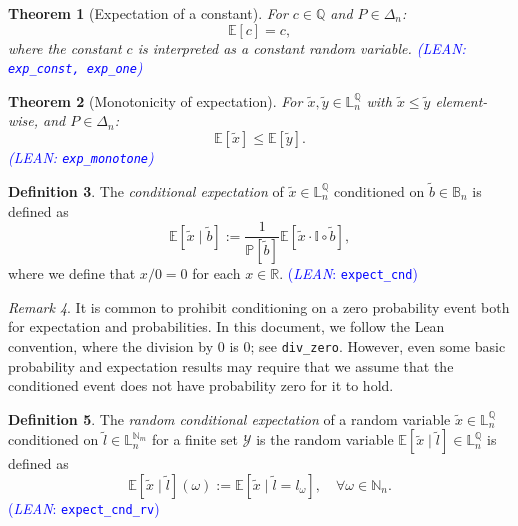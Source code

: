 \documentclass[letterpaper]{article}
\theoremstyle{plain}
\newtheorem{theorem}{Theorem}[subsection]
\theoremstyle{definition}
\newtheorem{definition}[theorem]{Definition}
\theoremstyle{remark}
\newtheorem{remark}[theorem]{Remark}
\newcommand{\Nats}{\mathbb{N}}
\newcommand{\Real}{\mathbb{R}}
\newcommand{\E}{\mathbb{E}}
\newcommand{\PP}{\mathbb{P}}
\newcommand{\I}{\mathbb{I}}
\newcommand{\lean}[1]{\textcolor{blue}{(\emph{LEAN}: \texttt{#1})}}
\newcommand{\leanok}{}
\begin{document}
\begin{theorem}[Expectation of a constant] \label{thm:exp-const}
  For $c \in \mathbb{Q}$ and $P\in \Delta_n$:
  \[
    \E\left[ c \right] = c,
  \]
  where the constant $c$ is interpreted as a constant random variable.
  \lean{exp\_const, exp\_one} \leanok
\end{theorem}

\begin{theorem}[Monotonicity of expectation] \label{thm:exp-monotone}
  For $\tilde{x},\tilde{y} \in \mathbb{L}_n^{\mathbb{Q}}$ with $\tilde{x} \le \tilde{y}$ element-wise, and $P \in \Delta_n$:
  \[
    \E\left[ \tilde{x} \right] \le \E\left[ \tilde{y} \right].
  \]
  \lean{exp\_monotone} \leanok
\end{theorem}


\begin{definition} \label{def:expect-cnd}
The \emph{conditional expectation} of $\tilde{x} \in \mathbb{L}_n^{\mathbb{Q}}$ conditioned on $\tilde{b} \in \mathbb{B}_n$ is defined as
\[
\E \left[ \tilde{x} \mid  \tilde{b} \right] :=
\frac{1}{\PP[\tilde{b}]} \E \left[  \tilde{x} \cdot \I \circ \tilde{b} \right],
\]
where we define that $x / 0 = 0$ for each $x\in \Real$.
\lean{expect\_cnd} \leanok
\end{definition}

\begin{remark}
It is common to prohibit conditioning on a zero probability event both for expectation and probabilities. In this document, we follow the Lean convention, where the division by $0$ is $0$; see \texttt{div\_zero}. However, even some basic probability and expectation results may require that we assume that the conditioned event does not have probability zero for it to hold. 
\end{remark}

\begin{definition} \label{def:expect-cnd-rv}
The \emph{random conditional expectation} of a random variable $\tilde{x} \in \mathbb{L}_n^{\mathbb{Q}}$ conditioned on $\tilde{l} \in \mathbb{L}_n^{\Nats_m}$ for a finite set $\mathcal{Y}$ is the random variable $\E \left[ \tilde{x} \mid  \tilde{l} \right] \in \mathbb{L}_n^{\mathbb{Q}}$ is defined as
\[
\E \left[ \tilde{x} \mid  \tilde{l} \right](\omega)
:=
\E \left[ \tilde{x} \mid  \tilde{l} = l_{\omega} \right], \quad \forall \omega \in \Nats_n.
\]
\lean{expect\_cnd\_rv} \leanok
\end{definition}
\end{document}
